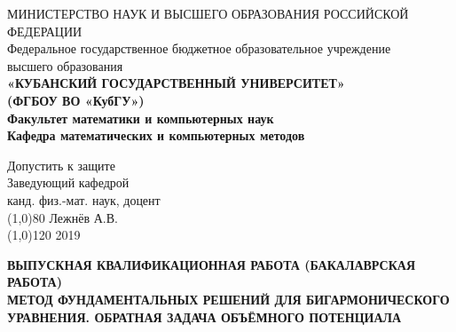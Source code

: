 \documentclass[a4paper]{article}
\begin{document}
\begin{titlepage}
	\newpage
	\begin{spacing}{1}
		\begin{center}
			\footnotesize МИНИСТЕРСТВО НАУК И ВЫСШЕГО ОБРАЗОВАНИЯ РОССИЙСКОЙ ФЕДЕРАЦИИ \\
			\small Федеральное государственное бюджетное образовательное учреждение \\высшего образования \\
			\normalsize \textbf{«КУБАНСКИЙ ГОСУДАРСТВЕННЫЙ УНИВЕРСИТЕТ»} \\
			\normalsize \textbf{(ФГБОУ ВО «КубГУ»)}\\
			\vspace{\baselineskip}
			\normalsize \textbf{Факультет математики и компьютерных наук}\\
			\normalsize \textbf{Кафедра математических и компьютерных методов}\\
		\end{center}
		
		\begin{flushleft}
			\hspace{8cm}Допустить к защите\\
			\hspace{8cm}Заведующий кафедрой\\
			\hspace{8cm}канд. физ.-мат. наук, доцент \\
			\hspace{8cm}\line(1,0){80} Лежнёв А.В. \\
			\hspace{8cm}\line(1,0){120} 2019
			
		\end{flushleft}
		
		\vspace{0.1cm}	
		
		\begin{center}
			\small \textbf{ВЫПУСКНАЯ КВАЛИФИКАЦИОННАЯ РАБОТА (БАКАЛАВРСКАЯ РАБОТА)} \\ 
			\vspace {\baselineskip}
			\small \textbf{МЕТОД ФУНДАМЕНТАЛЬНЫХ РЕШЕНИЙ ДЛЯ БИГАРМОНИЧЕСКОГО УРАВНЕНИЯ. ОБРАТНАЯ ЗАДАЧА ОБЪЁМНОГО ПОТЕНЦИАЛА} \\
		\end{center}
		
		\vspace{0.1cm}
		

\end{spacing}
\end{titlepage}
\end{document}
